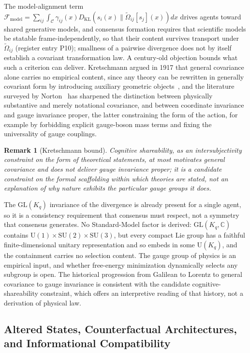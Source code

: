 \documentclass[11pt]{article}
\newtheorem{remark}{Remark}
\begin{document}
The model-alignment term $\mathcal{F}_{\text{model}} = \sum_{ij} \int_{\mathcal{C}} \gamma_{ij}(x) D_{\mathrm{KL}}(s_i(x) \| \tilde{\Omega}_{ij}[s_j](x)) dx$ drives agents toward shared generative models, and consensus formation requires that scientific models be statable frame-independently, so that their content survives transport under $\tilde{\Omega}_{ij}$ (register entry P10); smallness of a pairwise divergence does not by itself establish a covariant transformation law. A century-old objection bounds what such a criterion can deliver. Kretschmann argued in 1917 that general covariance alone carries no empirical content, since any theory can be rewritten in generally covariant form by introducing auxiliary geometric objects~\cite{Kretschmann1917}, and the literature surveyed by Norton~\cite{Norton1993} has sharpened the distinction between physically substantive and merely notational covariance, and between coordinate invariance and gauge invariance proper, the latter constraining the form of the action, for example by forbidding explicit gauge-boson mass terms and fixing the universality of gauge couplings.
\begin{remark}[Kretschmann bound]\label{rem:kretschmann}
Cognitive shareability, as an intersubjectivity constraint on the form of theoretical statements, at most motivates general covariance and does not deliver gauge invariance proper; it is a candidate constraint on the formal scaffolding within which theories are stated, not an explanation of why nature exhibits the particular gauge groups it does.
\end{remark}
The $\mathrm{GL}(K_q)$ invariance of the divergence is already present for a single agent, so it is a consistency requirement that consensus must respect, not a symmetry that consensus generates. No Standard-Model factor is derived: $\mathrm{GL}(K_q, \mathbb{C})$ contains $\mathrm{U}(1) \times \mathrm{SU}(2) \times \mathrm{SU}(3)$, but every compact Lie group has a faithful finite-dimensional unitary representation and so embeds in some $\mathrm{U}(K_q)$, and the containment carries no selection content. The gauge group of physics is an empirical input, and whether free-energy minimization dynamically selects any subgroup is open. The historical progression from Galilean to Lorentz to general covariance to gauge invariance is consistent with the candidate cognitive-shareability constraint, which offers an interpretive reading of that history, not a derivation of physical law.

\subsection{Altered States, Counterfactual Architectures, and Informational Compatibility}
\end{document}
